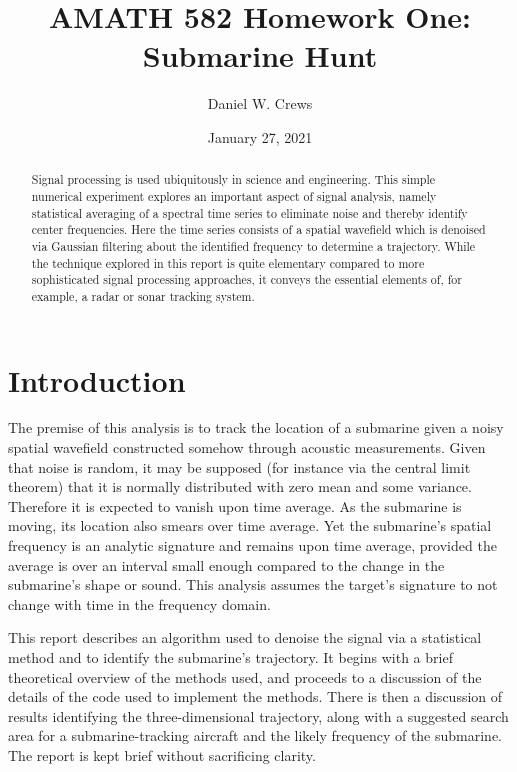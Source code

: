 \documentclass{article}
\title{AMATH 582 Homework One: Submarine Hunt}
\author{Daniel W. Crews}
\date{January 27, 2021}
\begin{document}
\maketitle

\begin{abstract}
    Signal processing is used ubiquitously in science and engineering. This simple numerical experiment explores an important aspect of signal analysis, namely statistical averaging of a spectral time series to eliminate noise and thereby identify center frequencies. Here the time series consists of a spatial wavefield which is denoised via Gaussian filtering about the identified frequency to determine a trajectory. While the technique explored in this report is quite elementary compared to more sophisticated signal processing approaches, it conveys the essential elements of, for example, a radar or sonar tracking system. %
\end{abstract}

\section{Introduction}
The premise of this analysis is to track the location of a submarine given a noisy spatial wavefield constructed somehow through acoustic measurements. Given that noise is random, it may be supposed (for instance via the central limit theorem) that it is normally distributed with zero mean and some variance. Therefore it is expected to vanish upon time average. As the submarine is moving, its location also smears over time average. Yet the submarine's spatial frequency is an analytic signature and remains upon time average, provided the average is over an interval small enough compared to the change in the submarine's shape or sound. This analysis assumes the target's signature to not change with time in the frequency domain.

This report describes an algorithm used to denoise the signal via a statistical method and to identify the submarine's trajectory. It begins with a brief theoretical overview of the methods used, and proceeds to a discussion of the details of the code used to implement the methods. There is then a discussion of results identifying the three-dimensional trajectory, along with a suggested search area for a submarine-tracking aircraft and the likely frequency of the submarine. The report is kept brief without sacrificing clarity.
\end{document}
